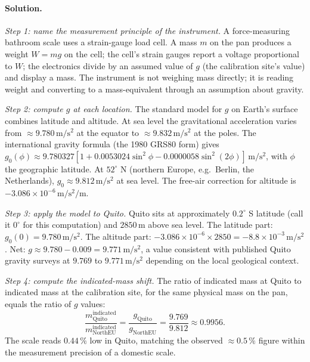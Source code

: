 \paragraph{Solution.}

\emph{Step 1: name the measurement principle of the instrument.}
A force-measuring bathroom scale uses a strain-gauge load cell. A
mass $m$ on the pan produces a weight $W = m g$ on the cell; the
cell's strain gauges report a voltage proportional to $W$; the
electronics divide by an assumed value of $g$ (the calibration
site's value) and display a mass. The instrument is not weighing
mass directly; it is reading weight and converting to a
mass-equivalent through an assumption about gravity.

\emph{Step 2: compute $g$ at each location.}
The standard model for $g$ on Earth's surface combines latitude
and altitude. At sea level the gravitational acceleration varies
from $\approx 9.780 \,\si{\meter\per\second\squared}$ at the
equator to $\approx 9.832 \,\si{\meter\per\second\squared}$ at the
poles. The international gravity formula (the 1980 GRS80 form)
gives $g_{0}(\phi) \approx 9.780327 [1 + 0.0053024 \sin^{2}\phi -
0.0000058 \sin^{2}(2\phi)] \,\si{\meter\per\second\squared}$, with
$\phi$ the geographic latitude. At $52^{\circ}$ N (northern
Europe, e.g.\ Berlin, the Netherlands), $g_{0} \approx 9.812 \,\si
{\meter\per\second\squared}$ at sea level. The free-air correction
for altitude is $-3.086 \times 10^{-6} \,\si{\meter\per\second
\squared\per\meter}$.

\emph{Step 3: apply the model to Quito.}
Quito sits at approximately $0.2^{\circ}$ S latitude (call it
$0^{\circ}$ for this computation) and $2850 \,\si{\meter}$ above
sea level. The latitude part: $g_{0}(0) = 9.780 \,\si{\meter\per
\second\squared}$. The altitude part: $-3.086 \times 10^{-6}
\times 2850 = -8.8 \times 10^{-3} \,\si{\meter\per\second\squared}$.
Net: $g \approx 9.780 - 0.009 = 9.771 \,\si{\meter\per\second
\squared}$, a value consistent with published Quito gravity
surveys at $9.769$ to $9.771 \,\si{\meter\per\second\squared}$
depending on the local geological context.

\emph{Step 4: compute the indicated-mass shift.}
The ratio of indicated mass at Quito to indicated mass at the
calibration site, for the same physical mass on the pan, equals
the ratio of $g$ values:
\[
\frac{m_{\mathrm{Quito}}^{\mathrm{indicated}}}
{m_{\mathrm{NorthEU}}^{\mathrm{indicated}}}
  = \frac{g_{\mathrm{Quito}}}{g_{\mathrm{NorthEU}}}
  = \frac{9.769}{9.812} \approx 0.9956.
\]
The scale reads $0.44\,\%$ low in Quito, matching the observed
$\approx 0.5\,\%$ figure within the measurement precision of a
domestic scale.

